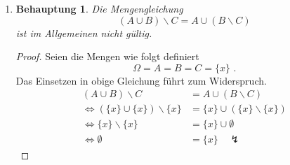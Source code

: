 \documentclass[a4paper]{scrartcl}
\newtheorem*{behaupt}{Behauptung}
\newcommand{\gdw}{\Leftrightarrow}
\begin{document}
\begin{enumerate}[label=\bfseries\arabic*.]
\begin{enumerate}[label=(\alph*)]
\begin{proof}
\begin{enumerate}
                        \item
                            $(A \backslash B) \cup (A \backslash C)
                            \supset A \backslash (B \cap C)$ \\
                            Da ausschließlich Äquivalenzumformungen vorgenommen
                            wurden, gilt obige Argumentation auch in der anderen
                            Richtung.
                    \end{enumerate}
                    Aus i. und ii. folgt die Behauptung.
                \end{proof}

            \item
                \begin{behaupt}
                    Die Mengengleichung
                    \begin{equation}
                        (A \cup B) \backslash C = A \cup (B \backslash C)
                    \end{equation}
                    ist im Allgemeinen nicht gültig.
                \end{behaupt}
                \begin{proof}
                    Seien die Mengen wie folgt definiert
                    \begin{equation}
                        \Omega = A = B = C = \{x\} \text{ .}
                    \end{equation}
                    Das Einsetzen in obige Gleichung führt zum Widerspruch.
                    \begin{equation}
                        \begin{split}
                        (A \cup B) \backslash C &= A \cup (B \backslash C) \\
                        \gdw (\{x\} \cup \{x\}) \backslash \{x\}
                        &= \{x\} \cup (\{x\} \backslash \{x\}) \\
                        \gdw \{x\} \backslash \{x\} &= \{x\} \cup \emptyset \\
                        \gdw \emptyset &= \{x\} \quad \lightning
                        \end{split}
                    \end{equation}
                \end{proof}

        \end{enumerate}


\end{enumerate}
\end{document}
